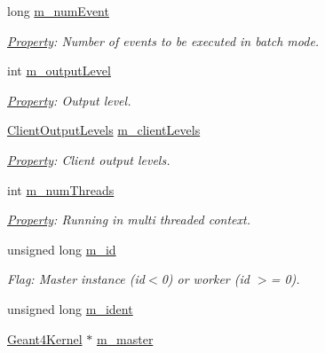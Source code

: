 \begin{DoxyCompactItemize}
long \hyperlink{class_d_d4hep_1_1_simulation_1_1_geant4_kernel_a5786c0e6c67534e109595f568df489a9}{m\_\-numEvent}
\begin{DoxyCompactList}\small\item\em \hyperlink{class_d_d4hep_1_1_property}{Property}: Number of events to be executed in batch mode. \item\end{DoxyCompactList}\item 
int \hyperlink{class_d_d4hep_1_1_simulation_1_1_geant4_kernel_a419eed43ed023a0b43a2ddc44f474708}{m\_\-outputLevel}
\begin{DoxyCompactList}\small\item\em \hyperlink{class_d_d4hep_1_1_property}{Property}: Output level. \item\end{DoxyCompactList}\item 
\hyperlink{class_d_d4hep_1_1_simulation_1_1_geant4_kernel_a259066f5e9a56bdbfc9718a2b42b8b06}{ClientOutputLevels} \hyperlink{class_d_d4hep_1_1_simulation_1_1_geant4_kernel_a6693f4923ea60f878c15f665edf79de2}{m\_\-clientLevels}
\begin{DoxyCompactList}\small\item\em \hyperlink{class_d_d4hep_1_1_property}{Property}: Client output levels. \item\end{DoxyCompactList}\item 
int \hyperlink{class_d_d4hep_1_1_simulation_1_1_geant4_kernel_a402cfabce5a04002713b4e35569911d7}{m\_\-numThreads}
\begin{DoxyCompactList}\small\item\em \hyperlink{class_d_d4hep_1_1_property}{Property}: Running in multi threaded context. \item\end{DoxyCompactList}\item 
unsigned long \hyperlink{class_d_d4hep_1_1_simulation_1_1_geant4_kernel_ad9fa311cf783a581dc24b158b754f3bc}{m\_\-id}
\begin{DoxyCompactList}\small\item\em Flag: Master instance (id$<$0) or worker (id $>$= 0). \item\end{DoxyCompactList}\item 
unsigned long \hyperlink{class_d_d4hep_1_1_simulation_1_1_geant4_kernel_ac7d95e62b3a0cb5180bdb3c20bd79a1d}{m\_\-ident}
\item 
\hyperlink{class_d_d4hep_1_1_simulation_1_1_geant4_kernel}{Geant4Kernel} $\ast$ \hyperlink{class_d_d4hep_1_1_simulation_1_1_geant4_kernel_a5d1ef9677e88ba8fc503d1cb70b84cf8}{m\_\-master}

\end{DoxyCompactItemize}
